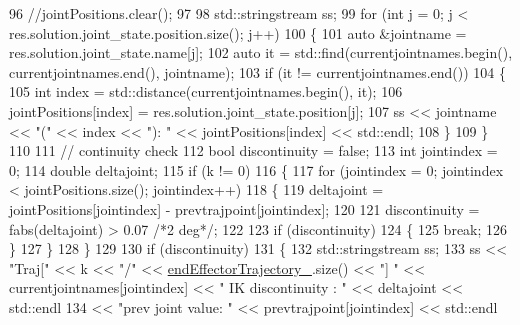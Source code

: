 \begin{DoxyCode}
96                 \textcolor{comment}{//jointPositions.clear();}
97 
98                 std::stringstream ss;
99                 \textcolor{keywordflow}{for} (\textcolor{keywordtype}{int} j = 0; j < res.solution.joint\_state.position.size(); j++)
100                 \{
101                     \textcolor{keyword}{auto} &jointname = res.solution.joint\_state.name[j];
102                     \textcolor{keyword}{auto} it = std::find(currentjointnames.begin(), currentjointnames.end(), jointname);
103                     \textcolor{keywordflow}{if} (it != currentjointnames.end())
104                     \{
105                         \textcolor{keywordtype}{int} index = std::distance(currentjointnames.begin(), it);
106                         jointPositions[index] = res.solution.joint\_state.position[j];
107                         ss << jointname << \textcolor{stringliteral}{"("} << index << \textcolor{stringliteral}{"): "} << jointPositions[index] << std::endl;
108                     \}
109                 \}
110 
111                 \textcolor{comment}{// continuity check}
112                 \textcolor{keywordtype}{bool} discontinuity = \textcolor{keyword}{false};
113                 \textcolor{keywordtype}{int} jointindex = 0;
114                 \textcolor{keywordtype}{double} deltajoint;
115                 \textcolor{keywordflow}{if} (k != 0)
116                 \{
117                     \textcolor{keywordflow}{for} (jointindex = 0; jointindex < jointPositions.size(); jointindex++)
118                     \{
119                         deltajoint = jointPositions[jointindex] - prevtrajpoint[jointindex];
120 
121                         discontinuity = fabs(deltajoint) > 0.07 \textcolor{comment}{/*2 deg*/};
122 
123                         \textcolor{keywordflow}{if} (discontinuity)
124                         \{
125                             \textcolor{keywordflow}{break};
126                         \}
127                     \}
128                 \}
129 
130                 \textcolor{keywordflow}{if} (discontinuity)
131                 \{
132                     std::stringstream ss;
133                     ss << \textcolor{stringliteral}{"Traj["} << k << \textcolor{stringliteral}{"/"} << \hyperlink{classcl__move__group__interface_1_1CbMoveEndEffectorTrajectory_ae13dfd31ea3660646e03882f0c2c29f0}{endEffectorTrajectory\_}.size() << \textcolor{stringliteral}{"] 
      "} << currentjointnames[jointindex] << \textcolor{stringliteral}{" IK discontinuity : "} << deltajoint << std::endl
134                        << \textcolor{stringliteral}{"prev joint value: "} << prevtrajpoint[jointindex] << std::endl

\end{DoxyCode}
